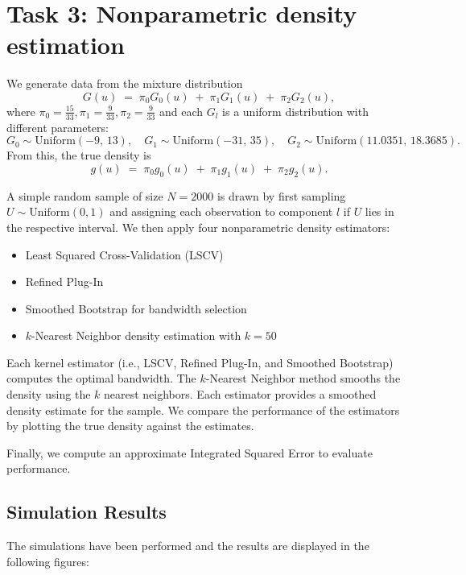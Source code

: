 \documentclass{article}
\begin{document}
\section{Task 3: Nonparametric density estimation}

We generate data from the mixture distribution 
\[
  G(u) \;=\; \pi_{0} G_{0}(u) \;+\; \pi_{1} G_{1}(u) \;+\; \pi_{2} G_{2}(u),
\]
where \(\pi_{0} = \tfrac{15}{33}, \pi_{1} = \tfrac{9}{33}, \pi_{2} = \tfrac{9}{33}\) and each \(G_{l}\) is a uniform distribution with different parameters:
\[
  G_{0} \sim \mathrm{Uniform}(-9,\,13), \quad
  G_{1} \sim \mathrm{Uniform}(-31,\,35), \quad
  G_{2} \sim \mathrm{Uniform}(11.0351,\,18.3685).
\]
From this, the true density is
\[
   g(u) \;=\; \pi_{0} g_{0}(u) \;+\; \pi_{1} g_{1}(u) \;+\; \pi_{2} g_{2}(u).
\]

A simple random sample of size \(N = 2000\) is drawn by first sampling \(U \sim \text{Uniform}(0, 1)\) and assigning each observation to component \(l\) if \(U\) lies in the respective interval. We then apply four nonparametric density estimators:

\begin{itemize}
  \item Least Squared Cross-Validation (LSCV)
  \item Refined Plug-In
  \item Smoothed Bootstrap for bandwidth selection
  \item \(k\)-Nearest Neighbor density estimation with \(k = 50\)
\end{itemize}

Each kernel estimator (i.e., LSCV, Refined Plug-In, and Smoothed Bootstrap) computes the optimal bandwidth. The \(k\)-Nearest Neighbor method smooths the density using the \(k\) nearest neighbors. Each estimator provides a smoothed density estimate for the sample. We compare the performance of the estimators by plotting the true density against the estimates.

Finally, we compute an approximate Integrated Squared Error to evaluate performance.

\subsection{Simulation Results}

The simulations have been performed and the results are displayed in the following figures:
\end{document}
